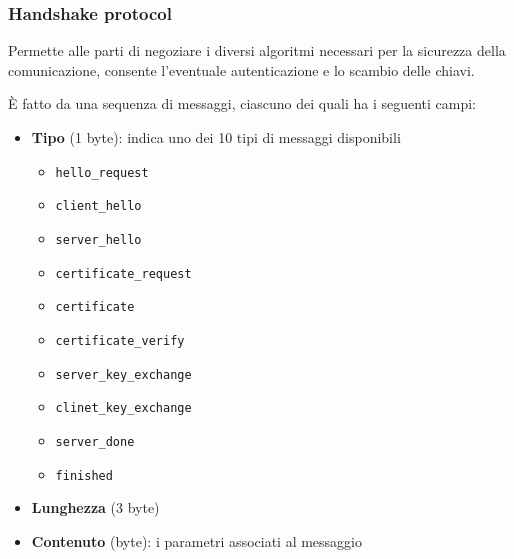 \subsubsection{Handshake protocol}
Permette alle parti di negoziare i diversi algoritmi necessari per la sicurezza 
della comunicazione, consente l'eventuale autenticazione e lo scambio delle chiavi.

\noindent È fatto da una sequenza di messaggi, ciascuno dei quali ha i 
seguenti campi:
\begin{itemize}
    \item \textbf{Tipo} (1 byte): indica uno dei 10 tipi di messaggi disponibili
    \begin{itemize}
        \item \texttt{hello\_request}
        \item \texttt{client\_hello}
        \item \texttt{server\_hello}
        \item \texttt{certificate\_request}
        \item \texttt{certificate}
        \item \texttt{certificate\_verify}
        \item \texttt{server\_key\_exchange}
        \item \texttt{clinet\_key\_exchange}
        \item \texttt{server\_done}
        \item \texttt{finished}
    \end{itemize}
    \item \textbf{Lunghezza} (3 byte)
    \item \textbf{Contenuto} (byte): i parametri associati al messaggio
\end{itemize}


